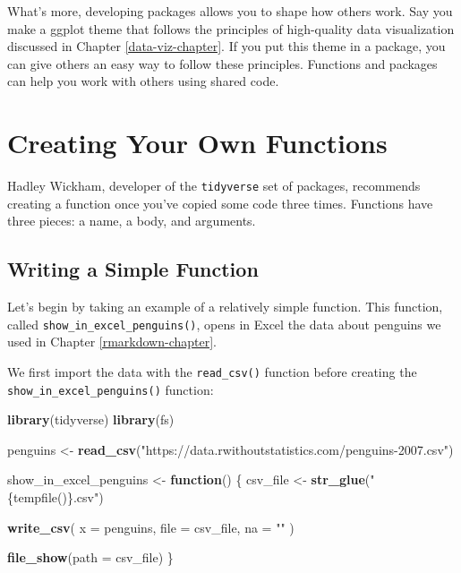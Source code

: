\documentclass[
]{book}
\newenvironment{Shaded}{\begin{snugshade}}{\end{snugshade}}
\newcommand{\AttributeTok}[1]{\textcolor[rgb]{0.13,0.29,0.53}{#1}}
\newcommand{\ControlFlowTok}[1]{\textcolor[rgb]{0.13,0.29,0.53}{\textbf{#1}}}
\newcommand{\FunctionTok}[1]{\textcolor[rgb]{0.13,0.29,0.53}{\textbf{#1}}}
\newcommand{\NormalTok}[1]{#1}
\newcommand{\OtherTok}[1]{\textcolor[rgb]{0.56,0.35,0.01}{#1}}
\newcommand{\StringTok}[1]{\textcolor[rgb]{0.31,0.60,0.02}{#1}}
\begin{document}
What's more, developing packages allows you to shape how others work. Say you make a ggplot theme that follows the principles of high-quality data visualization discussed in Chapter \ref{data-viz-chapter}. If you put this theme in a package, you can give others an easy way to follow these principles. Functions and packages can help you work with others using shared code.

\hypertarget{creating-your-own-functions}{%
\section*{Creating Your Own Functions}\label{creating-your-own-functions}}

Hadley Wickham, developer of the \texttt{tidyverse} set of packages, recommends creating a function once you've copied some code three times. Functions have three pieces: a name, a body, and arguments.

\hypertarget{writing-a-simple-function}{%
\subsection*{Writing a Simple Function}\label{writing-a-simple-function}}

Let's begin by taking an example of a relatively simple function. This function, called \texttt{show\_in\_excel\_penguins()}, opens in Excel the data about penguins we used in Chapter \ref{rmarkdown-chapter}.

We first import the data with the \texttt{read\_csv()} function before creating the \texttt{show\_in\_excel\_penguins()} function:

\begin{Shaded}
\begin{Highlighting}[]
\FunctionTok{library}\NormalTok{(tidyverse)}
\FunctionTok{library}\NormalTok{(fs)}

\NormalTok{penguins }\OtherTok{\textless{}{-}} \FunctionTok{read\_csv}\NormalTok{(}\StringTok{"https://data.rwithoutstatistics.com/penguins{-}2007.csv"}\NormalTok{)}

\NormalTok{show\_in\_excel\_penguins }\OtherTok{\textless{}{-}} \ControlFlowTok{function}\NormalTok{() \{}
\NormalTok{  csv\_file }\OtherTok{\textless{}{-}} \FunctionTok{str\_glue}\NormalTok{(}\StringTok{"\{tempfile()\}.csv"}\NormalTok{)}

  \FunctionTok{write\_csv}\NormalTok{(}
    \AttributeTok{x =}\NormalTok{ penguins,}
    \AttributeTok{file =}\NormalTok{ csv\_file,}
    \AttributeTok{na =} \StringTok{""}
\NormalTok{  )}

  \FunctionTok{file\_show}\NormalTok{(}\AttributeTok{path =}\NormalTok{ csv\_file)}
\NormalTok{\}}
\end{Highlighting}
\end{Shaded}
\end{document}
